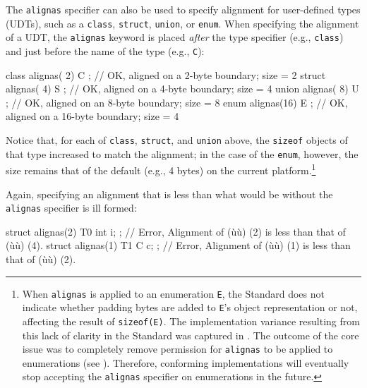 The \lstinline!alignas! specifier can also be used to specify alignment for
user-defined types (UDTs), such as a \lstinline!class!, \lstinline!struct!,
\lstinline!union!, or \lstinline!enum!. When specifying the alignment of a UDT,
 the \lstinline!alignas! keyword is placed \emph{after} the
type specifier (e.g., \lstinline!class!) and just before the name of the
type (e.g., \lstinline!C!):

\begin{emcppslisting}
class  alignas( 2) C { };  // OK, aligned on a  2-byte boundary; size = 2
struct alignas( 4) S { };  // OK, aligned on a  4-byte boundary; size = 4
union  alignas( 8) U { };  // OK, aligned on an 8-byte boundary; size = 8
enum   alignas(16) E { };  // OK, aligned on a 16-byte boundary; size = 4
\end{emcppslisting}

\noindent Notice that, for each of \lstinline!class!, \lstinline!struct!, and
\lstinline!union! above, the \lstinline!sizeof! objects of that type increased
to match the alignment; in the case of the \lstinline!enum!, however, the
size remains that of the default  (e.g., 4
bytes) on the current platform.{\cprotect\footnote{When \lstinline!alignas!
is applied to an enumeration \lstinline!E!, the Standard does not
indicate whether padding bytes are added to \lstinline!E!'s object
representation or not, affecting the result of \lstinline!sizeof(E)!. The
implementation variance resulting from this lack of clarity in the
  Standard was captured in \cite{miller17}. The outcome of the core
  issue was to completely remove permission for \lstinline!alignas! to be
  applied to enumerations (see \cite{iso18a}). Therefore, conforming implementations will
  eventually stop accepting the \lstinline!alignas! specifier on
  enumerations in the future.}}

Again, specifying an alignment that is less than what would be without the \lstinline!alignas! specifier is ill formed:

\begin{emcppslisting}
struct alignas(2) T0 { int i; };
    // Error, Alignment of (ù{}ù) (2) is less than that of (ù{}ù) (4).
struct alignas(1) T1 { C c; };
    // Error, Alignment of (ù{}ù) (1) is less than that of (ù{}ù) (2).
\end{emcppslisting}



